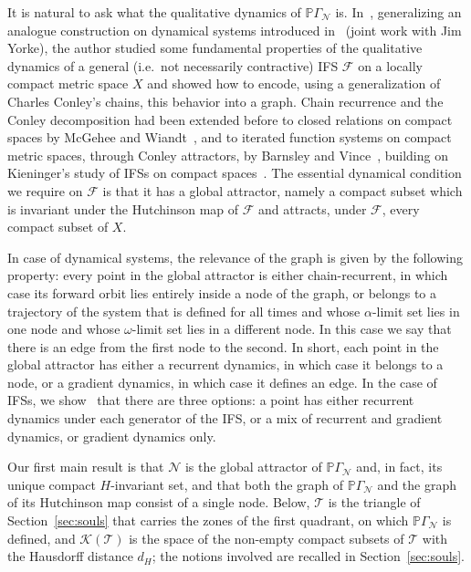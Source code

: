 \documentclass[11pt]{amsart}
\theoremstyle{definition}
\theoremstyle{remark}
\newcommand{\cN}{\mathcal N}
\newcommand{\cF}{\mathcal F}
\newcommand{\cT}{\mathcal T}
\newcommand{\PGN}{{\mathbb P}\Gamma_{\mathcal N}}
\begin{document}
It is natural to ask what the qualitative dynamics of $\PGN$ is.
In~\cite{DLstreams}, generalizing an analogue construction on dynamical systems introduced in~\cite{DLY26DCDS,DeLeoYorke2026JDE} (joint work with Jim Yorke), the author studied some fundamental properties of the qualitative dynamics of a general (i.e.\ not necessarily contractive) IFS $\cF$ on a locally compact metric space $X$ and showed how to encode, using a generalization of Charles Conley's chains, this behavior into a graph. Chain recurrence and the Conley decomposition had been extended before to closed relations on compact spaces by McGehee and Wiandt~\cite{MW06}, and to iterated function systems on compact metric spaces, through Conley attractors, by Barnsley and Vince~\cite{BV13}, building on Kieninger's study of IFSs on compact spaces~\cite{Kie02}.
The essential dynamical condition we require on $\cF$ is that it has a global attractor, namely a compact subset which is invariant under the Hutchinson map of $\cF$ and attracts, under $\cF$, every compact subset of $X$.

In case of dynamical systems, the relevance of the graph is given by the following property: every point in the global attractor is either chain-recurrent, in which case its forward orbit lies entirely inside a node of the graph, or belongs to a trajectory of the system that is defined for all times and whose $\alpha$-limit set lies in one node and whose $\omega$-limit set lies in a different node.
In this case we say that there is an edge from the first node to the second.
In short, each point in the global attractor has either a recurrent dynamics, in which case it belongs to a node, or a gradient dynamics, in which case it defines an edge.
In the case of IFSs, we show~\cite{DLstreams} that there are three options: a point has either recurrent dynamics under each generator of the IFS, or a mix of recurrent and gradient dynamics, or gradient dynamics only.

Our first main result is that $\cN$ is the global attractor of $\PGN$ and, in fact, its unique compact $H$-invariant set, and that both the graph of $\PGN$ and the graph of its Hutchinson map consist of a single node. Below, $\cT$ is the triangle of Section~\ref{sec:souls} that carries the zones of the first quadrant, on which $\PGN$ is defined, and $\mathcal K(\cT)$ is the space of the non-empty compact subsets of $\cT$ with the Hausdorff distance $d_H$; the notions involved are recalled in Section~\ref{sec:souls}.
\end{document}
